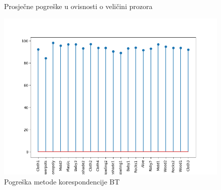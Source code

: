 \documentclass[utf8, zavrsni, numeric]{fer}
\begin{document}
\begin{figure}[H]
  \centering
  \hfill
  \caption{Prosječne pogreške u ovisnosti o veličini prozora}
\end{figure}

\begin{figure}[H]
  \centering
  \includegraphics[width=13cm]{img/BT_lokalno_middlebury.png}
  \caption{Pogreška metode korespondencije BT}
  \label{fig:bt-local-error}
\end{figure}
\end{document}
